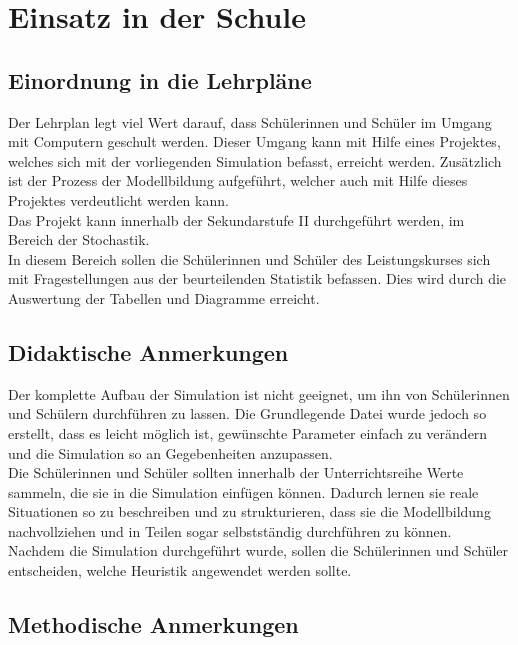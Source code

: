 \section{Einsatz in der Schule}
\subsection{Einordnung in die Lehrpläne}

Der Lehrplan %
legt viel Wert darauf, dass Schülerinnen und Schüler im Umgang mit Computern geschult werden. Dieser Umgang kann mit Hilfe eines Projektes, welches sich mit der vorliegenden Simulation befasst, erreicht werden. Zusätzlich ist der Prozess der Modellbildung aufgeführt, welcher auch mit Hilfe dieses Projektes verdeutlicht werden kann.\\
Das Projekt kann innerhalb der Sekundarstufe II durchgeführt werden, im Bereich der Stochastik. \\
In diesem Bereich sollen die Schülerinnen und Schüler des Leistungskurses sich mit Fragestellungen aus der beurteilenden Statistik befassen. Dies wird durch die Auswertung der Tabellen und Diagramme erreicht. 

\subsection{Didaktische Anmerkungen}

Der komplette Aufbau der Simulation ist nicht geeignet, um ihn von Schülerinnen und Schülern durchführen zu lassen. Die Grundlegende Datei wurde jedoch so erstellt, dass es leicht möglich ist, gewünschte Parameter einfach zu verändern und die Simulation so an Gegebenheiten anzupassen.\\
Die Schülerinnen und Schüler sollten innerhalb der Unterrichtsreihe Werte sammeln, die sie in die Simulation einfügen können. Dadurch lernen sie reale Situationen so zu beschreiben und zu strukturieren, dass sie die Modellbildung nachvollziehen und in Teilen sogar selbstständig durchführen zu können.\\
Nachdem die Simulation durchgeführt wurde, sollen die Schülerinnen und Schüler entscheiden, welche Heuristik angewendet werden sollte. 

\subsection{Methodische Anmerkungen}

